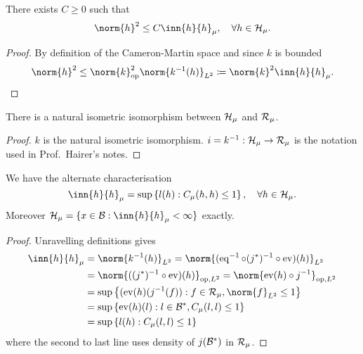 \begin{corollary}
	There exists $C \geq 0$ such that
	\begin{equation}
		\norm{h}^2 \leq C \inn{h}{h}_{\mu}, \quad \forall h \in \calH_{\mu}.
	\end{equation}
\end{corollary}
\begin{proof}
	By definition of the Cameron-Martin space and since $k$ is bounded
	\begin{align}
		\norm{h}^2 \leq \norm{k}_{\op}^2 \norm{k^{-1}(h)}_{L^2}
		\defeq \norm{k}^2 \inn{h}{h}_{\mu}.
	\end{align}
\end{proof}
\begin{corollary}
	There is a natural isometric isomorphism between $\mathcal H_{\mu}$ and $\mathcal R_{\mu}$.
\end{corollary}
\begin{proof}
	$k$ is the natural isometric isomorphism. $i = k^{-1}: \mathcal H_{\mu} \to \mathcal R_{\mu}$ is the notation used in Prof.\ Hairer's notes.
\end{proof}
\begin{corollary}
	We have the alternate characterisation
	\begin{equation}
		\inn{h}{h}_{\mu} = \sup \left\{ l(h) : C_{\mu}(h, h) \leq 1\right\}, \quad \forall h \in \calH_{\mu}.
	\end{equation}
	Moreover $\calH_{\mu} = \{x \in \calB : \inn{h}{h}_{\mu} < \infty\}$ exactly.
\end{corollary}
\begin{proof}
	Unravelling definitions gives
	\begin{align}
		\inn{h}{h}_{\mu}
		&= \norm{k^{-1}(h)}_{L^2}
		= \norm{(\eq^{-1} \circ (j^*)^{-1} \circ \ev)(h)}_{L^2} \\
		&= \norm{((j^*)^{-1} \circ \ev)(h)}_{\op, L^2}
		= \norm{\ev(h) \circ j^{-1}}_{\op, L^2} \\
		&= \sup \left\{ (\ev(h)(j^{-1}(f)) : f \in \calR_{\mu}, \norm{f}_{L^2} \leq 1\right\} \\
		&= \sup \left\{ \ev(h)(l) : l \in \calB^*, C_{\mu}(l, l) \leq 1\right\} \\
		&= \sup \left\{ l(h) : C_{\mu}(l, l) \leq 1\right\}
	\end{align}
	where the second to last line uses density of $j(\mathcal B^*)$ in $\mathcal R_{\mu}$.
\end{proof}

